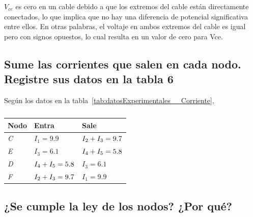 \documentclass[twocolumn, 12pt]{article}
\begin{document}
$V_{ce}$ es cero en un cable debido a que los extremos del cable
están directamente conectados, lo que implica que no hay
una diferencia de potencial significativa entre ellos. En
otras palabras, el voltaje en ambos extremos del cable es
igual pero con signos opuestos, lo cual resulta en un valor
de cero para Vce.

\subsection{Sume las corrientes que salen en cada nodo. Registre sus datos en la tabla 6}

Según los datos en la
tabla~\ref{tab:datosExperimentales__Corriente},

\begin{table}[H]
    \captionsetup{justification=centering}
    \centering

    \begin{tabularx}{0.9\linewidth}{|>{\centering\arraybackslash}X|>{\centering\arraybackslash}X|>{\centering\arraybackslash}X|}
        \hline
        \textbf{Nodo} & \textbf{Entra}               & \textbf{Sale}                \\\hline

        \textit{C}    & $I_1 = 9.9$                  & $I_2 + I_3 \linebreak = 9.7$ \\\hline

        \textit{E}    & $I_3 = 6.1$                  & $I_4 + I_5 \linebreak = 5.8$ \\\hline

        \textit{D}    & $I_4 + I_5 \linebreak = 5.8$ & $I_3 = 6.1$                  \\\hline

        \textit{F}    & $I_2 + I_3 \linebreak = 9.7$ & $I_1 = 9.9$                  \\\hline

    \end{tabularx}
    \caption{}

    \label{tab:analisisDatos__6}
\end{table}

\subsection{¿Se cumple la ley de los nodos? ¿Por qué?}
\end{document}
